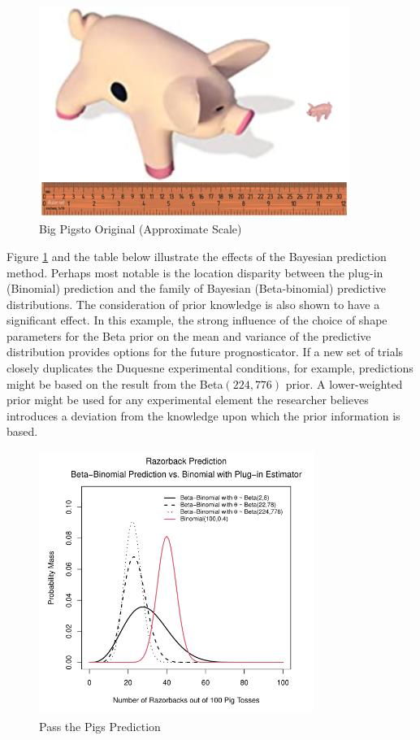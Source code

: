 \documentclass[12pt, a4paper]{article}
\begin{document}
\begin{figure}[ht]
  \centering
  \includegraphics[width=0.9\textwidth]{./Graphics/PassThePigs/PigSize_wRuler}
  \caption{Big Pigs\texttrademark to Original (Approximate Scale)}
\end{figure}


\noindent Figure \ref{fig:PtPBB} and the table below illustrate the effects of the Bayesian prediction method. Perhaps most notable is the location disparity between the plug-in (Binomial) prediction and the family of Bayesian (Beta-binomial) predictive distributions.  The consideration of prior knowledge is also shown to have a significant effect.  In this example, the strong influence of the choice of shape parameters for the Beta prior on the mean and variance of the predictive distribution provides options for the future prognosticator. If a new set of trials closely duplicates the Duquesne experimental conditions, for example, predictions might be based on the result from the Beta$(224,776)$ prior.  A lower-weighted prior might be used for any experimental element the researcher believes introduces a deviation from the knowledge upon which the prior information is based.

\vspace{1cm}

\begin{figure}[ht]
  \centering
  \includegraphics[width=0.8\textwidth]{./Graphics/PassThePigs/PTP_BBplot}
  \caption{Pass the Pigs\textsuperscript{\circledR} Prediction}
  \label{fig:PtPBB}
\end{figure}
\end{document}
